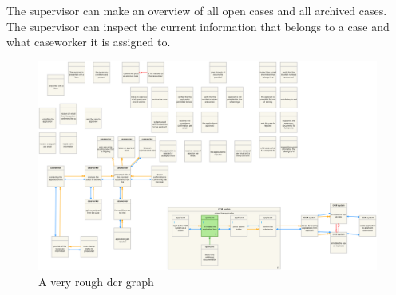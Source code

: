 The supervisor can make an overview of all open cases and all archived cases. The supervisor can inspect the current information that belongs to a case and what caseworker it is assigned to.
\newpage
\begin{figure}[htb!]
	\includegraphics[width=\textwidth]{img/dcr}
	\caption{A very rough dcr graph}
\end{figure}